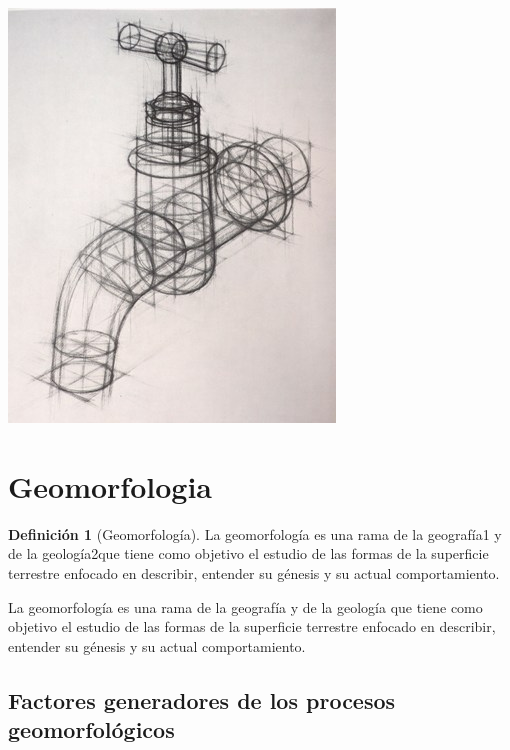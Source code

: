 \documentclass[16pt,]{krantz}
\theoremstyle{definition}
\newtheorem{definition}{Definición}[chapter]
\theoremstyle{definition}
\theoremstyle{definition}
\theoremstyle{definition}
\theoremstyle{remark}
\begin{document}
\includegraphics{pol2.jpeg}

\hypertarget{geomorfologia}{%
\section{Geomorfologia}\label{geomorfologia}}

\begin{definition}[Geomorfología]
\protect\hypertarget{def:www2}{}{\label{def:www2} {} }La geomorfología es una rama de la geografía1​ y de la geología2​ que tiene como objetivo el estudio de las formas de la superficie terrestre enfocado en describir, entender su génesis y su actual comportamiento.
\end{definition}
La geomorfología es una rama de la geografía y de la geología​ que tiene como objetivo el estudio de las formas de la superficie terrestre enfocado en describir, entender su génesis y su actual comportamiento.

\hypertarget{factores-generadores-de-los-procesos-geomorfoluxf3gicos}{%
\subsection{Factores generadores de los procesos geomorfológicos}\label{factores-generadores-de-los-procesos-geomorfoluxf3gicos}}
\end{document}
